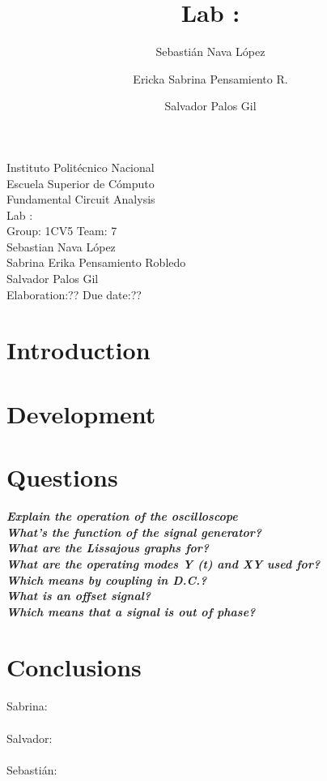 \documentclass[letterpaper]{article}
\title{Lab :}
\author{
    Sebastián Nava López\\
    \and
    Ericka Sabrina Pensamiento R.\\
    \and
    Salvador Palos Gil
}
\begin{document}
\begin{titlepage}
    \centering
    {\Huge Instituto Politécnico Nacional}\\[3ex]
    {\huge Escuela Superior de Cómputo}\\[8ex]
    {\huge Fundamental Circuit Analysis}\\[12ex]
    {\Large Lab : }\\[20ex]
    {\Large Group: 1CV5 Team: 7 \\[8ex]
    Sebastian Nava López\\[4ex]
    Sabrina Erika Pensamiento Robledo\\[4ex]
    Salvador Palos Gil\\[18ex]
    }
    \large{Elaboration:?? \hspace{8em} Due date:??}
\end{titlepage}
\tableofcontents
\newpage
\section{Introduction}
\newpage
\section{Development}
\section{Questions}
\textit{\textbf{Explain the operation of the oscilloscope}}\\
\textit{\textbf{What's the function of the signal generator?}}\\
\textit{\textbf{What are the Lissajous graphs for?}}\\
\textit{\textbf{What are the operating modes Y (t) and XY used for?}}\\
\textit{\textbf{Which means by coupling in D.C.?}}\\
\textit{\textbf{What is an offset signal?}}\\
\textit{\textbf{Which means that a signal is out of phase?}}\\
\section{Conclusions}
{\large Sabrina:}\\
%
\\[2ex]
{\large Salvador:}\\
%
\\[2ex]
{\large Sebastián:}\\
\end{document}
